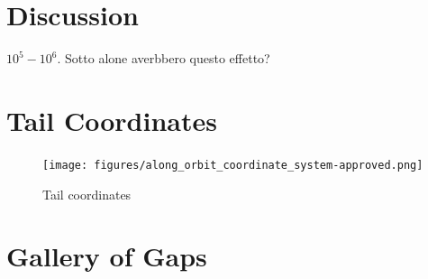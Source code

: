 \documentclass[]{aa}
\begin{document}
  \section{Discussion}
    $10^5-10^6$. Sotto alone averbbero questo effetto? 








\begin{appendix}

  \section{Tail Coordinates} \label{appendix:TailCoordinates}

  \begin{figure}
    \centering
    \texttt{[image: figures/along\_orbit\_coordinate\_system-approved.png]}
    \caption{Tail coordinates}
    \label{fig:TailCoordinates}
  \end{figure}




  \section{Gallery of Gaps}


\end{appendix}
\end{document}
